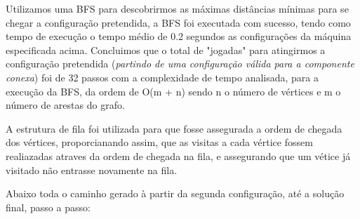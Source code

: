 \documentclass[10pt,a4paper]{report}
\begin{document}
Utilizamos uma BFS para descobrirmos as máximas distâncias mínimas para se chegar a configuração pretendida, a BFS foi executada com sucesso, tendo como tempo de execução o tempo médio de 0.2 segundos as configurações da máquina especificada acima. Concluimos que o total de "jogadas" para atingirmos a configuração pretendida (\textit{partindo de uma configuração válida para a componente conexa}) foi de 32 passos com a complexidade de tempo analisada, para a execução da BFS, da ordem de O(m + n) sendo n o número de vértices e m o número de arestas do grafo.

A estrutura de fila foi utilizada para que fosse assegurada a ordem de chegada dos vértices, proporcianando assim, que as visitas a cada vértice fossem realiazadas atraves da ordem de chegada na fila, e assegurando que um vétice já visitado não entrasse novamente na fila.

Abaixo toda o caminho gerado à partir da
segunda configuração, até a solução final, passo a passo:
\end{document}
